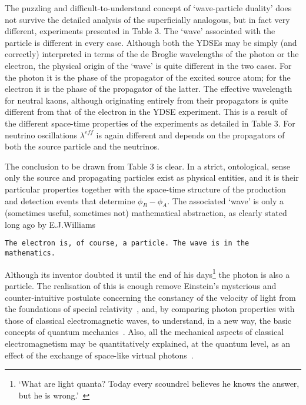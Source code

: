 {  \par The puzzling and difficult-to-understand concept of `wave-particle duality' does not survive the detailed
  analysis of the superficially analogous, but in fact very different, experiments presented in Table 3.
   The `wave' associated
  with the particle is different in every case. Although both the YDSEs may be simply (and correctly) interpreted
  in terms of the de Broglie wavelengths of the photon or the electron, the physical origin of the `wave'
  is quite different in the two cases. For the photon it is the phase of the propagator of the excited
  source atom; for the electron it is the phase of the propagator of the latter. The effective
  wavelength for neutral kaons, although originating entirely from their propagators is quite 
  different from that of the electron in the YDSE experiment. This is a result of the different
 space-time properties of the experiments as detailed in Table 3. For neutrino oscillations
   $\lambda^{eff}$ is again different and depends on the propagators of both the source particle
  and the neutrinos. 
  \par The conclusion to be drawn from Table 3 is clear. In a strict, ontological, sense only the
   source and propagating particles exist as physical entities, and it is their particular
   properties together with the space-time structure of the production and detection events that determine
   $\phi_B-\phi_A$. The associated `wave' is only a (sometimes useful, sometimes not) mathematical
   abstraction, as clearly stated long ago by E.J.Williams~\cite{Williams}
   \par {\tt The electron is, of course, a particle. The wave is in the mathematics.}
    \par Although its inventor doubted it until the end of his days\footnote{`What are light quanta?
    Today every scoundrel believes he knows the answer, but he is wrong.'~\cite{EinBess}} the photon is 
    also a particle. The realisation of this is enough remove Einstein's mysterious and counter-intuitive postulate
    concerning the constancy of the velocity of light from the foundations of special relativity~\cite{JHF5},
    and, by comparing photon properties with those of classical electromagnetic waves, to understand,
    in a new way, the basic concepts of quantum mechanics~\cite{JHF6}. Also, all the mechanical aspects of
    classical electromagnetism may be quantitatively explained, at the quantum level, as an effect of
    the exchange of space-like virtual photons~\cite{JHF7}.

}

